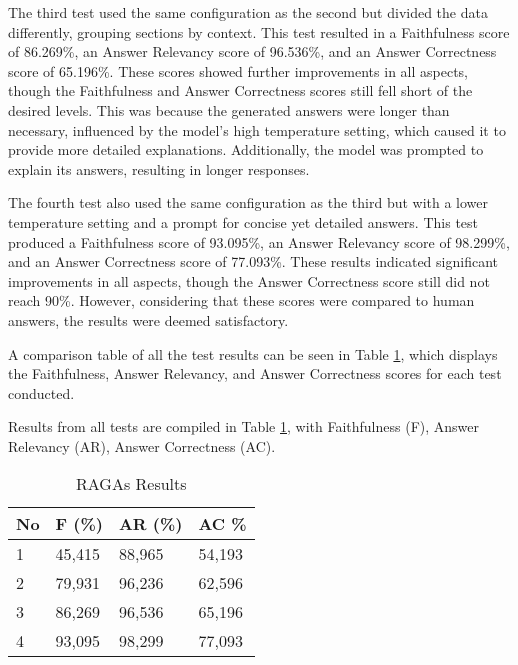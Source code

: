 The third test used the same configuration as the second but divided the data differently, grouping sections by context. This test resulted in a Faithfulness score of 86.269\%, an Answer Relevancy score of 96.536\%, and an Answer Correctness score of 65.196\%. These scores showed further improvements in all aspects, though the Faithfulness and Answer Correctness scores still fell short of the desired levels. This was because the generated answers were longer than necessary, influenced by the model's high temperature setting, which caused it to provide more detailed explanations. Additionally, the model was prompted to explain its answers, resulting in longer responses.

The fourth test also used the same configuration as the third but with a lower temperature setting and a prompt for concise yet detailed answers. This test produced a Faithfulness score of 93.095\%, an Answer Relevancy score of 98.299\%, and an Answer Correctness score of 77.093\%. These results indicated significant improvements in all aspects, though the Answer Correctness score still did not reach 90\%. However, considering that these scores were compared to human answers, the results were deemed satisfactory.

A comparison table of all the test results can be seen in Table \ref{tab:hasilragas}, which displays the Faithfulness, Answer Relevancy, and Answer Correctness scores for each test conducted.

Results from all tests are compiled in Table \ref{tab:hasilragas}, with Faithfulness (F), Answer Relevancy (AR), Answer Correctness (AC).


\begin{table}[!htbp]
  \caption{RAGAs Results}
  \label{tab:hasilragas}
  \centering
  \begin{tabular}{llll}
    \toprule
    No & F (\%) & AR (\%) & AC {\%} \\
    \midrule
    1& 45,415  & 88,965 & 54,193 \\
    2& 79,931 & 96,236 & 62,596 \\
    3& 86,269 & 96,536 & 65,196 \\
    4& 93,095 & 98,299 & 77,093 \\
    \bottomrule
  \end{tabular}
\end{table}



% 

